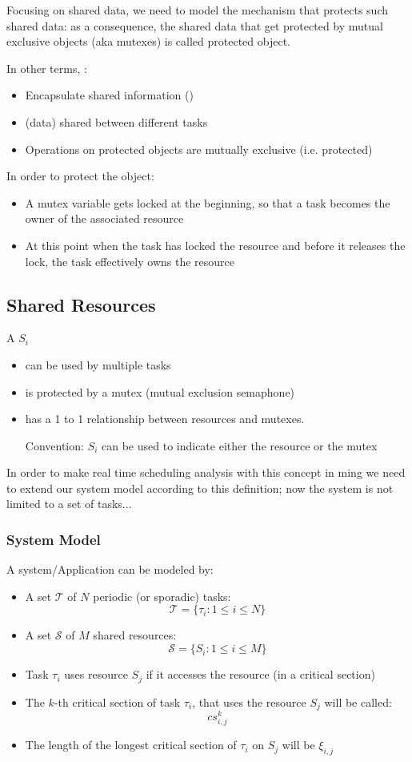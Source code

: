 Focusing on shared data, we need to model the mechanism that protects such shared data: as a consequence, the shared data that get protected by mutual exclusive objects (aka mutexes) is called protected object.

In other terms, :
\begin{itemize}
\item Encapsulate shared information ()
\item {} (data) shared between different tasks
\item Operations on protected objects are mutually exclusive (i.e. protected)
\end{itemize}

In order to protect the object:
\begin{itemize}
\item A mutex variable gets locked at the beginning, so that a task becomes the owner of the associated resource
\item At this point when the task has locked the resource and before it releases the lock, the task effectively owns the resource
\end{itemize}

\subsection{Shared Resources}

A  $S_i$
\begin{itemize}
\item can be used by multiple tasks
\item is protected by a mutex (mutual exclusion semaphone)
\item has a 1 to 1 relationship between resources and mutexes.

Convention: $S_i$ can be used to indicate either the resource or the mutex
\end{itemize}
In order to make real time scheduling analysis with this concept in ming we need to extend our system model according to this definition; now the system is not limited to a set of tasks...

\subsubsection{System Model}
A system/Application can be modeled by:
\begin{itemize}
\item A set $\mathcal{T}$ of $N$ periodic (or sporadic) tasks:
\[\mathcal{T} = \{\tau_i : 1\le i\le N\}\]
\item A set $\mathcal{S}$ of $M$ shared resources:
\[\mathcal{S}=\{S_i : 1 \le i \le M\}\]
\item Task $\tau_i$ uses resource $S_j$ if it accesses the resource (in a critical section)
\item The $k$-th critical section of task $\tau_i$, that uses the resource $S_j$ will be called:
\[cs_{i,j}^k\]
\item The length of the longest critical section of $\tau_i$ on $S_j$ will be $\xi_{i,j}$
\end{itemize}

